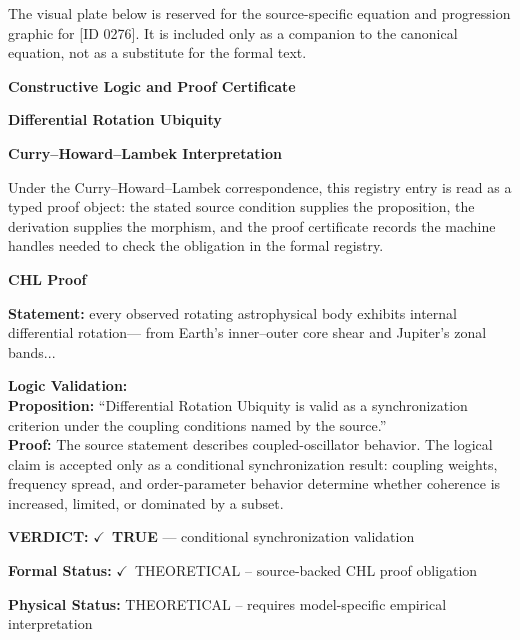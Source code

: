 \begingroup\footnotesize\sloppy
The visual plate below is reserved for the source-specific equation and progression graphic for [ID 0276]. It is included only as a companion to the canonical equation, not as a substitute for the formal text.
\par\endgroup
\ifTZPDarkEdition
{}
\fi

\clearpage
\begingroup\tzpsupportsetup
\noindent\textbf{\fontsize{10.8pt}{12.8pt}\selectfont [ID 0276] Constructive Logic and Proof Certificate}\par
\noindent\textbf{\fontsize{10pt}{12pt}\selectfont Differential Rotation Ubiquity}\par
\vspace{0.45em}
\begingroup
\footnotesize
\setlength{\parskip}{0.22em}
\setlength{\parindent}{0pt}
\noindent\textbf{Curry--Howard--Lambek Interpretation}\par
Under the Curry--Howard--Lambek correspondence, this registry entry is read as a typed proof
object: the stated source condition supplies the proposition, the derivation supplies the
morphism, and the proof certificate records the machine handles needed to check the obligation
in the formal registry.

\vspace{0.45em}
\noindent\textbf{CHL Proof}\par
\textbf{Statement:} every observed rotating astrophysical body exhibits internal differential rotation---
from Earth's inner--outer core shear and Jupiter's zonal bands...

\textbf{Logic Validation:}\\
\textbf{Proposition:} ``Differential Rotation Ubiquity is valid as a synchronization criterion under the
coupling conditions named by the source.''\\
\textbf{Proof:} The source statement describes coupled-oscillator behavior. The logical claim is
accepted only as a conditional synchronization result: coupling weights, frequency
spread, and order-parameter behavior determine whether coherence is increased, limited,
or dominated by a subset.

\textbf{VERDICT:} \ensuremath{\checkmark}\ \textbf{TRUE} --- conditional synchronization validation

\textbf{Formal Status:} \ensuremath{\checkmark}\ THEORETICAL -- source-backed CHL proof obligation

\textbf{Physical Status:} THEORETICAL -- requires model-specific empirical interpretation
\par\vspace{0.45em}
\par
\ifTZPDarkEdition
{}
\fi
\endgroup
\endgroup
